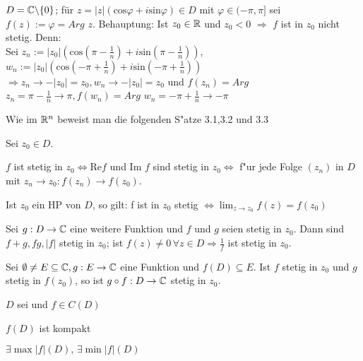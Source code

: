 \documentclass[a4paper,twoside,DIV15,BCOR12mm]{scrbook}
\begin{document}
\begin{beispiel}
$D = \mathbb{C} \backslash \{0\}$; für $z = |z|(\text{cos} \varphi + i \text{sin}\varphi) \in D$ mit $\varphi \in (-\pi,\pi]$ sei $f(z) := \varphi = Arg$ $ z$.
Behauptung: Ist $z_0 \in \mathbb{R}$ und $z_0 < 0$ $\Rightarrow$ $f$ ist in $z_0$ nicht stetig. Denn: \\
Sei $z_n := |z_0|(\text{cos}(\pi-\frac{1}{n})+i\text{sin}(\pi-\frac{1}{n}))$, $w_n := |z_0|(\text{cos}(-\pi+\frac{1}{n})+i\text{sin}(-\pi+\frac{1}{n}))$ 
$\Rightarrow z_n \to -|z_0| = z_0, w_n \to -|z_0| = z_0$ und $f(z_n) = Arg$ $ z_n = \pi - \frac{1}{n} \to \pi, f(w_n) = Arg$ $ w_n = -\pi + \frac{1}{n} \to -\pi$

\end{beispiel}


Wie im $\mathbb{R}^n$ beweist man die folgenden S"atze 3.1,3.2 und 3.3

\begin{satz}
Sei $z_0 \in D$.
\begin{liste}
\item $f$ ist stetig in $z_0 \Leftrightarrow $Re$f$ und Im $\! f$ sind stetig in $z_0 \Leftrightarrow$ f"ur jede Folge $(z_n)$ in $D$ mit $z_n \rightarrow z_0: f(z_n) \rightarrow f(z_0).$
\item Ist $z_0$ ein HP von $D$, so gilt: f ist in $z_0$ stetig $\Leftrightarrow \lim_{z \rightarrow z_0} f(z) = f(z_0)$
\item Sei $g:D \rightarrow \mathbb{C}$ eine weitere Funktion und $f$ und $g$ seien stetig in $z_0$. Dann sind $f+g, fg, |f|$ stetig in $z_0$; ist $f(z) \not= 0 \, \forall z \in D \Rightarrow \frac1{f}$ ist stetig in $z_0$.
\end{liste}
\end{satz}

\begin{satz}
Sei $\emptyset \not= E \subseteq \mathbb{C}, g:E \rightarrow \mathbb{C}$ eine Funktion und $f(D) \subseteq E$. Ist $f$ stetig in $z_0$ und $g$ stetig in $f(z_0)$, so ist $g \circ f: D \rightarrow \mathbb{C}$ stetig in $z_0$.
\end{satz}

\begin{satz}
$D$ sei  und $f \in C(D)$
\begin{liste}
\item $f(D)$ ist kompakt
\item $\exists \max |f|(D), \, \exists \min |f|(D)$
\end{liste}
\end{satz}
\end{document}
